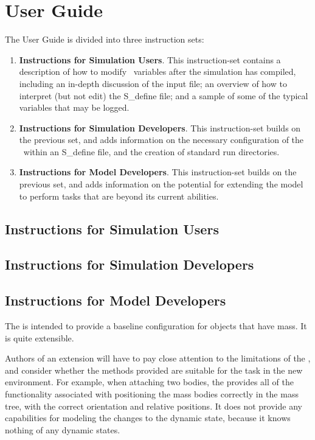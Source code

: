 \chapter{User Guide}\label{ch:user}
The User Guide is divided into three instruction sets:
\begin{enumerate}
 \item \textbf{Instructions for Simulation Users}.  This instruction-set
 contains a description of how to modify \ModelDesc\ variables after the
 simulation has compiled, including an in-depth discussion of the input file;
 an overview of how to interpret (but not edit) the S\_define file; and a
 sample of some of the typical variables that may be logged.
 \item \textbf{Instructions for Simulation Developers}.  This instruction-set
 builds on the previous set, and adds information on the necessary
 configuration of the \ModelDesc\ within an S\_define file, and the creation of
 standard run directories.
 \item \textbf{Instructions for Model Developers}.   This instruction-set
 builds on the previous set, and adds information on the potential for
 extending the model to perform tasks that are beyond its current abilities.
\end{enumerate}

\section{Instructions for Simulation Users}\label{sec:guide_sim_user}

\section{Instructions for Simulation Developers}

\section{Instructions for Model Developers}

The \ModelDesc is intended to provide a baseline configuration for objects that
have mass.  It is quite extensible.

Authors of an extension will have to pay close attention to the limitations of
the \ModelDesc, and consider whether the methods provided are suitable for the
task in the new environment.  For example, when attaching two bodies, the
\ModelDesc provides all of the functionality associated with positioning the
mass bodies correctly in the mass tree, with the correct orientation and
relative positions.  It does not provide any capabilities for modeling the
changes to the dynamic state, because it knows nothing of any dynamic states.